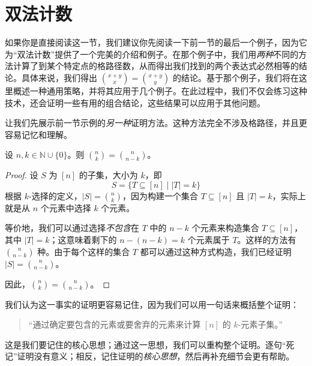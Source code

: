 \section{双法计数}\label{sec:section8.4}

如果你是直接阅读这一节，我们建议你先阅读一下前一节的最后一个例子，因为它为``双法计数''提供了一个完美的介绍和例子。在那个例子中，我们用\emph{两种}不同的方法计算了到某个特定点的格路径数，从而得出我们找到的两个表达式必然相等的结论。具体来说，我们得出 ${x+y \choose x}={x+y \choose y}$ 的结论。基于那个例子，我们将在这里概述一种通用策略，并将其应用于几个例子。在此过程中，我们不仅会练习这种技术，还会证明一些有用的组合结论，这些结果可以应用于其他问题。

让我们先展示前一节示例的\emph{另一种}证明方法。这种方法完全不涉及格路径，并且更容易记忆和理解。

\begin{proposition}
    设 $n,k \in \mathbb{N} \cup \{0\}$。则 ${n \choose k} = {n \choose n-k}$。
\end{proposition}

\begin{proof}
    设 $S$ 为 $[n]$ 的子集，大小为 $k$，即
    \[S = \{T \subseteq [n] \mid |T| = k\}\]
    根据 $k$-选择的定义，$|S|={n \choose k}$，因为构建一个集合 $T \subseteq [n]$ 且 $|T| = k$，实际上就是从 $n$ 个元素中选择 $k$ 个元素。

    等价地，我们可以通过选择\emph{不包含}在 $T$ 中的 $n - k$ 个元素来构造集合 $T \subseteq [n]$，其中 $|T| = k$；这意味着剩下的 $n - (n - k) = k$ 个元素属于 $T$。这样的方法有 ${n \choose n-k}$ 种。由于每个这样的集合 $T$ 都可以通过这种方式构造，我们已经证明 $|S| = {n \choose n-k}$。

    因此，${n \choose k} = {n \choose n-k}$。
\end{proof}

我们认为这一事实的证明更容易记住，因为我们可以用一句话来概括整个证明：

\begin{quotation}
    ``通过确定要包含的元素或要舍弃的元素来计算 $[n]$ 的 $k$-元素子集。''
\end{quotation}

这是我们要记住的核心思想；通过这一思想，我们可以重构整个证明。逐句``死记''证明没有意义；相反，记住证明的\emph{核心思想}，然后再补充细节会更有帮助。










